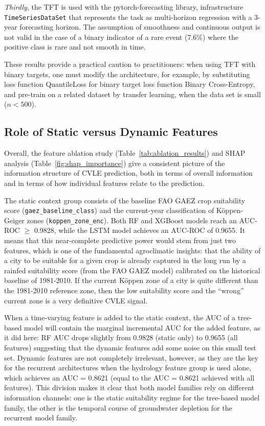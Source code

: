 \documentclass{ieeeaccess}
\begin{document}
\textit{Thirdly}, the TFT is used with the pytorch-forecasting library, infrastructure \texttt{TimeSeriesDataSet} that represents the task as multi-horizon regression with a 3-year forecasting horizon. The assumption of smoothness and continuous output is not valid in the case of a binary indicator of a rare event (7.6\%) where the positive class is rare and not smooth in time.

These results provide a practical caution to practitioners: when using TFT with binary targets, one must modify the architecture, for example, by substituting loss function QuantileLoss for binary target loss function Binary Cross-Entropy, and pre-train on a related dataset by transfer learning, when the data set is small ($n < 500$).

\subsection{Role of Static versus Dynamic Features}

Overall, the feature ablation study (Table~\ref{tab:ablation_results}) and SHAP analysis (Table~\ref{fig:shap_importance}) give a consistent picture of the information structure of CVLE prediction, both in terms of overall information and in terms of how individual features relate to the prediction.

The static context group consists of the baseline FAO GAEZ crop suitability score (\texttt{gaez\_baseline\_class}) and the current-year classification of Köppen-Geiger zones (\texttt{koppen\_zone\_enc}). Both RF and XGBoost models reach an AUC-ROC $\geq$ 0.9828, while the LSTM model achieves an AUC-ROC of 0.9655. It means that this near-complete predictive power would stem from just two features, which is one of the fundamental agroclimatic insights: that the ability of a city to be suitable for a given crop is already captured in the long run by a rainfed suitability score (from the FAO GAEZ model) calibrated on the historical baseline of 1981-2010. If the current Köppen zone of a city is quite different than the 1981-2010 reference zone, then the low suitability score and the ``wrong'' current zone is a very definitive CVLE signal.

When a time-varying feature is added to the static context, the AUC of a tree-based model will contain the marginal incremental AUC for the added feature, as it did here: RF AUC drops slightly from 0.9828 (static only) to 0.9655 (all features) suggesting that the dynamic features add some noise on this small test set. Dynamic features are not completely irrelevant, however, as they are the key for the recurrent architectures when the hydrology feature group is used alone, which achieves an AUC = 0.8621 (equal to the AUC = 0.8621 achieved with all features). This division makes it clear that both model families rely on different information channels: one is the static suitability regime for the tree-based model family, the other is the temporal course of groundwater depletion for the recurrent model family.
\end{document}
